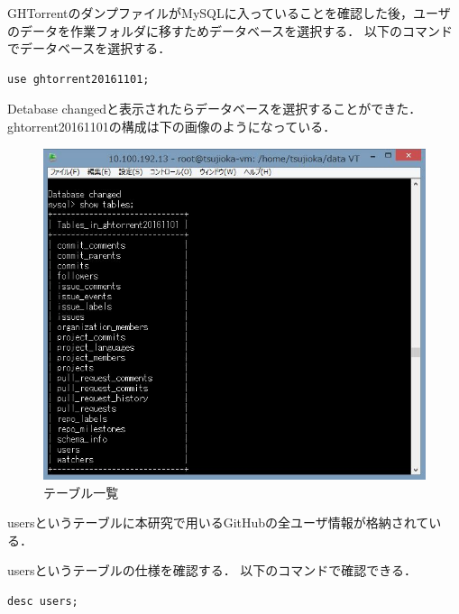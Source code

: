 \newpage
GHTorrentのダンプファイルがMySQLに入っていることを確認した後，ユーザのデータを作業フォルダに移すためデータベースを選択する．
以下のコマンドでデータベースを選択する．
\begin{lstlisting}[basicstyle=\ttfamily\footnotesize, frame=single]
use ghtorrent20161101;
\end{lstlisting}
Detabase changedと表示されたらデータベースを選択することができた．
ghtorrent20161101の構成は下の画像のようになっている．
\begin{figure}[htb]
\centering
\includegraphics[width=12cm]{showtables.JPG}
\caption{テーブル一覧}\label{サンプル図}
\end{figure}

usersというテーブルに本研究で用いるGitHubの全ユーザ情報が格納されている．


\newpage

usersというテーブルの仕様を確認する．
以下のコマンドで確認できる．
\begin{lstlisting}[basicstyle=\ttfamily\footnotesize, frame=single]
desc users;
\end{lstlisting}

